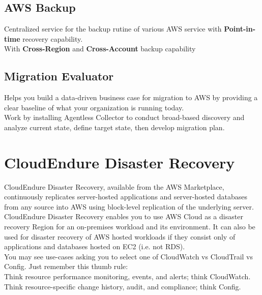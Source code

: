\documentclass[12pt, letterpaper, twoside]{article}
\begin{document}
\subsection{AWS Backup}
Centralized service for the backup rutine of various AWS service with \textbf{Point-in-time} recovery capability.\\
With \textbf{Cross-Region} and \textbf{Cross-Account} backup capability

\subsection{Migration Evaluator}
Helps you build a data-driven business case for migration to AWS by providing a clear baseline of what your organization 
is running today.\\
Work by installing Agentless Collector to conduct broad-based discovery and analyze current state, define target state, 
then develop migration plan.\\


\section{CloudEndure Disaster Recovery}
CloudEndure Disaster Recovery, available from the AWS Marketplace, continuously replicates server-hosted applications 
and server-hosted databases from any source into AWS using block-level replication of the underlying server. 
CloudEndure Disaster Recovery enables you to use AWS Cloud as a disaster recovery Region for an on-premises workload and its 
environment. It can also be used for disaster recovery of AWS hosted workloads if they consist only of 
applications and databases hosted on EC2 (i.e. not RDS).\\

You may see use-cases asking you to select one of CloudWatch vs CloudTrail vs Config. Just remember this thumb rule:\\
Think resource performance monitoring, events, and alerts; think CloudWatch.\\
Think resource-specific change history, audit, and compliance; think Config.\\

\printindex
\end{document}

